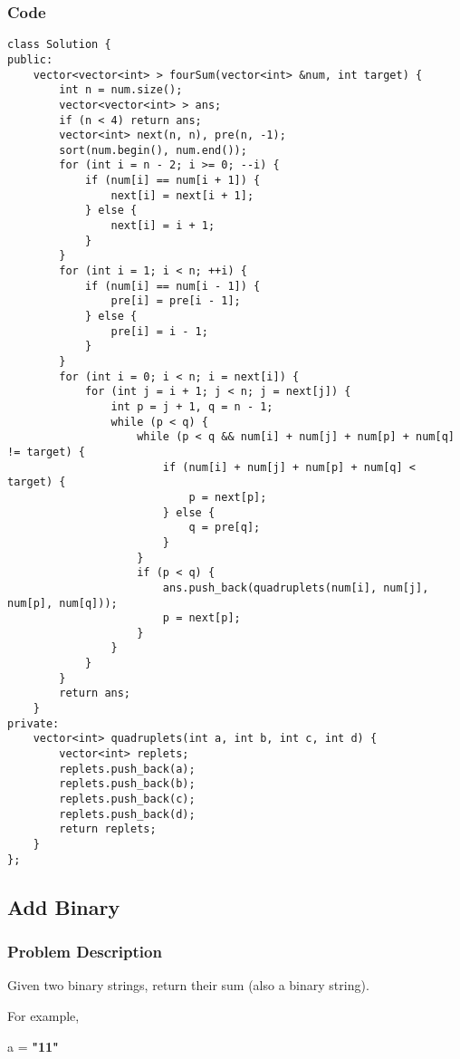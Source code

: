 \documentclass[courier]{article}
\begin{document}
\begin{CJK*}{UTF8}{gkai}
\subsubsection*{Code}
\begin{lstlisting}
class Solution {
public:
    vector<vector<int> > fourSum(vector<int> &num, int target) {
        int n = num.size();
        vector<vector<int> > ans;
        if (n < 4) return ans;
        vector<int> next(n, n), pre(n, -1);
        sort(num.begin(), num.end());
        for (int i = n - 2; i >= 0; --i) {
            if (num[i] == num[i + 1]) {
                next[i] = next[i + 1];
            } else {
                next[i] = i + 1;
            }
        }
        for (int i = 1; i < n; ++i) {
            if (num[i] == num[i - 1]) {
                pre[i] = pre[i - 1];
            } else {
                pre[i] = i - 1;
            }
        }
        for (int i = 0; i < n; i = next[i]) {
            for (int j = i + 1; j < n; j = next[j]) {
                int p = j + 1, q = n - 1;
                while (p < q) {
                    while (p < q && num[i] + num[j] + num[p] + num[q] != target) {
                        if (num[i] + num[j] + num[p] + num[q] < target) {
                            p = next[p];
                        } else {
                            q = pre[q];
                        }
                    }
                    if (p < q) {
                        ans.push_back(quadruplets(num[i], num[j], num[p], num[q]));
                        p = next[p];
                    }
                }
            }
        }
        return ans;
    }
private:
    vector<int> quadruplets(int a, int b, int c, int d) {
        vector<int> replets;
        replets.push_back(a);
        replets.push_back(b);
        replets.push_back(c);
        replets.push_back(d);
        return replets;
    }
}; 
\end{lstlisting}


\subsection{ Add Binary }

\subsubsection*{Problem Description}
Given two binary strings, return their sum (also a binary string).

For example,


a = \textbf{"11"}



\end{CJK*}
\end{document}
